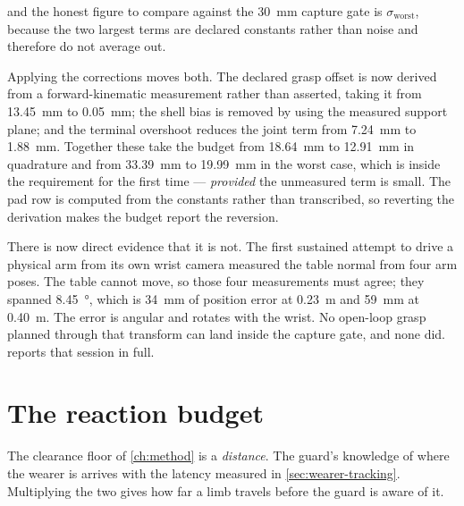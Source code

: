 and the honest figure to compare against the \SI{30}{\milli\metre} capture
gate is $\sigma_{\text{worst}}$, because the two largest terms are declared
constants rather than noise and therefore do not average out.

Applying the corrections moves both. The declared grasp offset is now derived
from a forward-kinematic measurement rather than asserted, taking it from
\SI{13.45}{\milli\metre} to \SI{0.05}{\milli\metre}; the shell bias is removed
by using the measured support plane; and the terminal overshoot reduces the
joint term from \SI{7.24}{\milli\metre} to \SI{1.88}{\milli\metre}. Together
these take the budget from \SI{18.64}{\milli\metre} to
\SI{12.91}{\milli\metre} in quadrature and from \SI{33.39}{\milli\metre} to
\SI{19.99}{\milli\metre} in the worst case, which is inside the requirement
for the first time --- \emph{provided} the unmeasured term is small. The pad
row is computed from the constants rather than transcribed, so reverting the
derivation makes the budget report the reversion.

There is now direct evidence that it is not. The first sustained attempt to
drive a physical arm from its own wrist camera measured the table normal from
four arm poses. The table cannot move, so those four measurements must agree;
they spanned \SI{8.45}{\degree}, which is \SI{34}{\milli\metre} of position
error at \SI{0.23}{\metre} and \SI{59}{\milli\metre} at \SI{0.40}{\metre}. The
error is angular and rotates with the wrist. No open-loop grasp planned
through that transform can land inside the capture gate, and none did.
 reports that session in full.

\section{The reaction budget}

The clearance floor of \cref{ch:method} is a \emph{distance}. The guard's
knowledge of where the wearer is arrives with the latency measured in
\cref{sec:wearer-tracking}. Multiplying the two gives how far a limb travels
before the guard is aware of it.

